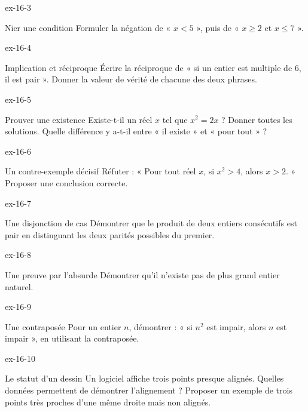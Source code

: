 \begin{blocLivre}{ex-16-3}
\begin{exercice}[1]{Nier une condition}
Formuler la négation de « $x<5$ », puis de « $x\ge2$ et $x\le7$ ».
\end{exercice}
\end{blocLivre}
\begin{blocLivre}{ex-16-4}
\begin{exercice}[1]{Implication et réciproque}
Écrire la réciproque de « si un entier est multiple de 6, il est pair ». Donner la valeur de vérité de chacune des deux phrases.
\end{exercice}
\end{blocLivre}
\begin{blocLivre}{ex-16-5}
\begin{exercice}[1]{Prouver une existence}
Existe-t-il un réel $x$ tel que $x^2=2x$ ? Donner toutes les solutions. Quelle différence y a-t-il entre « il existe » et « pour tout » ?
\end{exercice}
\end{blocLivre}

\clearpage{}
\begin{blocLivre}{ex-16-6}
\begin{exercice}[2]{Un contre-exemple décisif}
Réfuter : « Pour tout réel $x$, si $x^2>4$, alors $x>2$. » Proposer une conclusion correcte.
\end{exercice}
\end{blocLivre}
\begin{blocLivre}{ex-16-7}
\begin{exercice}[2]{Une disjonction de cas}
Démontrer que le produit de deux entiers consécutifs est pair en distinguant les deux parités possibles du premier.
\end{exercice}
\end{blocLivre}
\begin{blocLivre}{ex-16-8}
\begin{exercice}[2]{Une preuve par l’absurde}
Démontrer qu’il n’existe pas de plus grand entier naturel.
\end{exercice}
\end{blocLivre}
\begin{blocLivre}{ex-16-9}
\begin{exercice}[2]{Une contraposée}
Pour un entier $n$, démontrer : « si $n^2$ est impair, alors $n$ est impair », en utilisant la contraposée.
\end{exercice}
\end{blocLivre}
\begin{blocLivre}{ex-16-10}
\begin{exercice}[2]{Le statut d’un dessin}
Un logiciel affiche trois points presque alignés. Quelles données permettent de démontrer l’alignement ? Proposer un exemple de trois points très proches d’une même droite mais non alignés.
\end{exercice}
\end{blocLivre}

